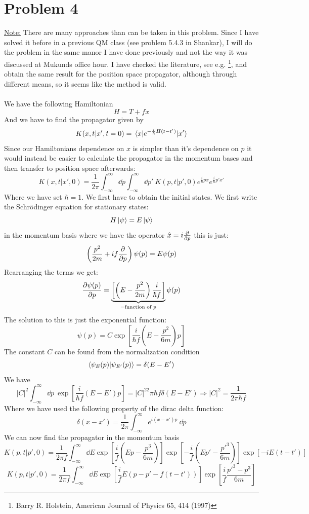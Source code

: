 \documentclass[a4paper,11pt]{article}
\newcommand{\be}{\begin{equation}}
\newcommand{\ee}{\end{equation}}
\newcommand{\ham}{H}
\newcommand{\kin}{T}
\begin{document}
\section*{Problem 4}
\underline{Note:} There are many approaches than can be taken in this problem. Since I have solved it before in a previous QM class (see problem 5.4.3 in Shankar), I will do the problem in the same manor I have done previously and not the way it was discussed at Mukunds office hour. I have checked the literature, see e.g. \footnote{Barry R. Holstein, American Journal of Physics 65, 414 (1997)}, and obtain the same result for the position space propagator, although through different means, so it seems like the method is valid.\\\\
We have the following Hamiltonian
\be
\ham=\kin+fx
\ee
And we have to find the propagator given by
\be
K(x,t|x',t=0)=\mel{x}{e^{-\frac{i}{\hbar}\ham (t-t')}}{x'}
\ee
Since our Hamiltonians dependence on $x$ is simpler than it's dependence on $p$ it would instead be easier to calculate the propagator in the momentum bases and then transfer to position space afterwards:
\[
K(x,t|x',0)=\frac{1}{2\pi}\int^{\infty}_{-\infty}\dd p\int^{\infty}_{-\infty}\dd p'\: K(p,t|p',0)e^{\frac{i}{\hbar}px}e^{\frac{i}{\hbar}p'x'}
\]
Where we have set $\hbar=1$. We first have to obtain the initial states. We first write the Schrödinger equation for stationary states:
\be
\ham\ket{\psi}=E\ket{\psi}
\ee
in the momentum basis where we have the operator $\hat{x}=i\pdv{}{p}$ this is just:
\be
\left(\frac{p^2}{2m}+if \pdv{}{p}\right)\psi(p)=E\psi(p)
\ee
Rearranging the terms we get:
\[
\pdv{\psi(p)}{p}= \underbrace{\left[\left( E-\frac{p^2}{2m} \right)\frac{i}{\hbar f}\right]}_{=\text{function of } p}\psi(p)
\]
The solution to this is just the exponential function:
\[
\psi(p)=C\exp[\frac{i}{\hbar f}\left( E-\frac{p^2}{6m} \right)p]
\]
The constant $C$ can be found from the normalization condition
\be
\braket{\psi_E(p)}{\psi_{E'}(p)}=\delta(E-E')
\ee
We have
\[
|C|^2\int^{\infty}_{-\infty}\dd p\:\exp[\frac{i}{\hbar f}\left( E-E' \right)p]
=|C|^22\pi\hbar f\delta(E-E')\Rightarrow |C|^2=\frac{1}{2\pi\hbar f}
\]
Where we have used the following property of the dirac delta function:
\[
\delta(x-x')=\frac{1}{2\pi}\int^{\infty}_{-\infty}e^{i(x-x')p}\:\dd p
\]
We can now find the propagator in the momentum basis
\[
K(p,t|p',0)=\frac{1}{2\pi f}\int^{\infty}_{-\infty}\dd E \exp[\frac{i}{ f}\left( Ep-\frac{p^3}{6m} \right)]\exp[-\frac{i}{ f}\left( Ep'-\frac{p'^3}{6m} \right)]\exp[-iE(t-t')]
\]
\[
K(p,t|p',0)=\frac{1}{2\pi f}\int^{\infty}_{-\infty}\dd E \exp[\frac{i}{ f}E\left( p-p'-f(t-t') \right)]\exp[\frac{i}{ f}\frac{p'^3-p^3}{6m}]
\]
\end{document}
